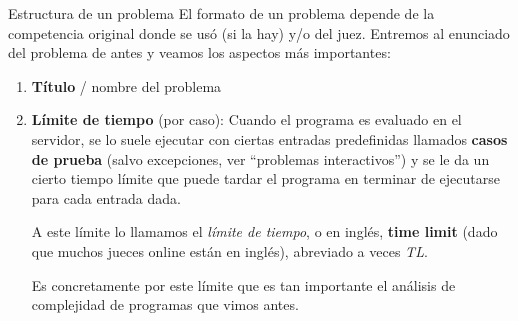 \documentclass{beamer}
\begin{document}
    \begin{frame}{Estructura de un problema}
        El formato de un problema depende de la competencia original donde se usó (si la hay) y/o del juez. \pause Entremos al enunciado del problema de antes y veamos los aspectos más importantes: \pause

        \begin{enumerate}
            \item \textbf{Título} / nombre del problema \pause
            \begin{center}
            \end{center}\pause

        \item \textbf{Límite de tiempo} (por caso): \pause Cuando el programa es evaluado en el servidor, se lo suele ejecutar con ciertas entradas predefinidas llamados \textbf{casos de prueba} (salvo excepciones, ver ``problemas interactivos'') y se le da un cierto tiempo límite que puede tardar el programa en terminar de ejecutarse para cada entrada dada. \pause

            A este límite lo llamamos el \textit{límite de tiempo}, o en inglés, \textbf{time limit} (dado que muchos jueces online están en inglés), abreviado a veces \textit{TL}. \pause

            Es concretamente por este límite que es tan importante el análisis de complejidad de programas que vimos antes.

        \end{enumerate}
    \end{frame}
\end{document}

